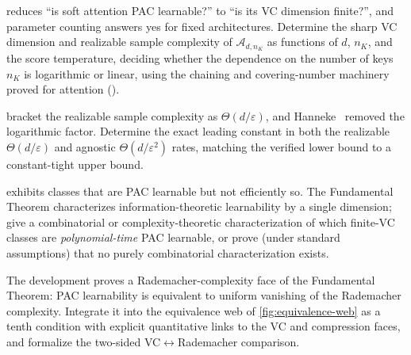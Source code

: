 \begin{openprob}
\label{op:attention-vc}
 reduces ``is soft attention PAC learnable?'' to ``is its VC dimension finite?'', and parameter counting answers yes for fixed architectures.  Determine the sharp VC dimension and realizable sample complexity of $\mathcal{A}_{d,n_K}$ as functions of $d$, $n_K$, and the score temperature, deciding whether the dependence on the number of keys $n_K$ is logarithmic or linear, using the chaining and covering-number machinery proved for attention ().
\end{openprob}

\begin{openprob}
\label{op:sample-constant}
 bracket the realizable sample complexity as $\Theta(d/\varepsilon)$, and Hanneke~\cite{Hanneke2016} removed the logarithmic factor.  Determine the exact leading constant in both the realizable $\Theta(d/\varepsilon)$ and agnostic $\Theta(d/\varepsilon^2)$ rates, matching the verified lower bound  to a constant-tight upper bound.
\end{openprob}

\begin{openprob}
\label{op:efficient-pac}
 exhibits classes that are PAC learnable but not efficiently so.  The Fundamental Theorem characterizes information-theoretic learnability by a single dimension; give a combinatorial or complexity-theoretic characterization of which finite-VC classes are \emph{polynomial-time} PAC learnable, or prove (under standard assumptions) that no purely combinatorial characterization exists.
\end{openprob}

\begin{openprob}
\label{op:rademacher-unify}
The development proves a Rademacher-complexity face of the Fundamental Theorem: PAC learnability is equivalent to uniform vanishing of the Rademacher complexity. Integrate it into the equivalence web of \cref{fig:equivalence-web} as a tenth condition with explicit quantitative links to the VC and compression faces, and formalize the two-sided VC$\leftrightarrow$Rademacher comparison.
\end{openprob}

